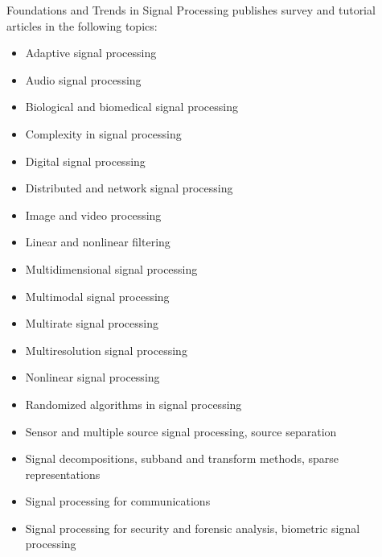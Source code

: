 


\journalaimsandscope
 {%
  Foundations and Trends\textsuperscript{\textregistered} in
  Signal Processing publishes
 survey and tutorial articles in the following topics:
 \begin{multicols}{2}\raggedcolumns
\footnotesize
 \begin{itemize}
\item{Adaptive signal processing}
\item{Audio signal processing}
\item{Biological and biomedical signal processing}
\item{Complexity in signal processing}
\item{Digital signal processing}
\item{Distributed and network signal processing}
\item{Image and video processing}
\item{Linear and nonlinear filtering}
\item{Multidimensional signal processing}
\item{Multimodal signal processing}
\item{Multirate signal processing}
\item{Multiresolution signal processing}
\item{Nonlinear signal processing}
\item{Randomized algorithms in signal processing}
\item{Sensor and multiple source signal processing, source separation}
\item{Signal decompositions, subband and transform methods, sparse representations}
\item{Signal processing for communications}
\item{Signal processing for security and forensic analysis, biometric signal processing}

\end{itemize}
\end{multicols}}
